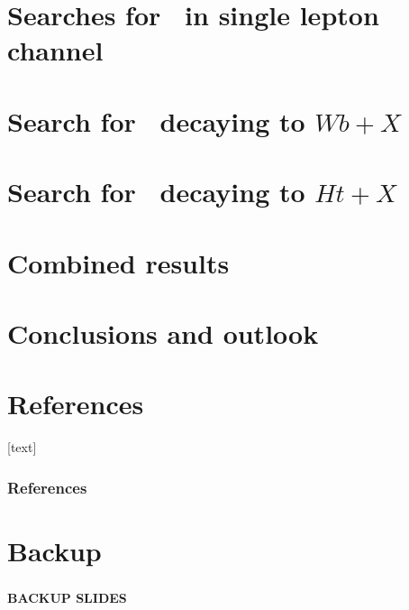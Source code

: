 \documentclass[xcolor=dvipsnames,10pt]{beamer}
\begin{document}
\section{Searches for \TTbar\ in single lepton channel}


\section{Search for \TTbar\ decaying to $Wb+X$}


\section{Search for \TTbar\ decaying to $Ht+X$}


\section{Combined results}


\section{Conclusions and outlook}


\appendix


\section*{References}
[text]

\begin{frame}[allowframebreaks]
\frametitle{References}\footnotesize

%

\end{frame}


\section*{Backup}

\begin{frame}
 \frametitle{}

\begin{center}{\bfseries
BACKUP SLIDES}
\end{center}
\end{frame}
\end{document}
